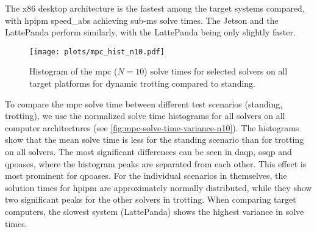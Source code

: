 The x86 desktop architecture is the fastest among the target systems compared, with \gls{hpipm} speed\_abs achieving sub-\unit{\milli\second} solve times. 
The Jetson and the LattePanda perform similarly, with the LattePanda being only slightly faster.
\begin{figure}
    \centering
    \texttt{[image: plots/mpc\_hist\_n10.pdf]}
    \caption{Histogram of the \gls{mpc} ($N=10$) solve times for selected solvers on all target platforms for dynamic trotting compared to standing. 
    }   \label{fig:mpc-solve-time-variance-n10}
\end{figure}
To compare the \gls{mpc} solve time between different test scenarios (standing, trotting), we use the normalized solve time histograms for all solvers on all computer architectures (see \autoref{fig:mpc-solve-time-variance-n10}). 
The histograms show that the mean solve time is less for the standing scenario than for trotting on all solvers. 
The most significant differences can be seen in \acrshort{daqp}, \acrshort{osqp} and \acrshort{qpoases}, where the histogram peaks are separated from each other. This effect is most prominent for \acrshort{qpoases}.
For the individual scenarios in themselves, the solution times for \gls{hpipm} are approximately normally distributed, while they show two significant peaks for the other solvers in trotting.
When comparing target computers, the slowest system (LattePanda) shows the highest variance in solve times.    

